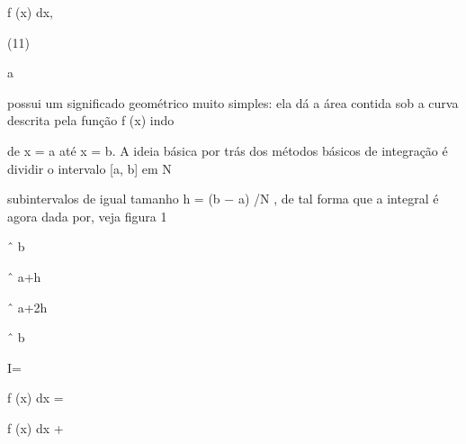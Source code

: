 \documentclass[a4paper,portrait,12pt]{article}
\begin{document}
\begin{flushleft}
f (x) dx,
\end{flushleft}





(11)





\begin{flushleft}
a
\end{flushleft}





\begin{flushleft}
possui um significado geom\'{e}trico muito simples: ela d\'{a} a \'{a}rea contida sob a curva descrita pela fun\c{c}\~{a}o f (x) indo
\end{flushleft}


\begin{flushleft}
de x = a at\'{e} x = b. A ideia b\'{a}sica por tr\'{a}s dos m\'{e}todos b\'{a}sicos de integra\c{c}\~{a}o \'{e} dividir o intervalo [a, b] em N
\end{flushleft}


\begin{flushleft}
subintervalos de igual tamanho h = (b $-$ a) /N , de tal forma que a integral \'{e} agora dada por, veja figura 1
\end{flushleft}


\begin{flushleft}
ˆ b
\end{flushleft}


\begin{flushleft}
ˆ a+h
\end{flushleft}


\begin{flushleft}
ˆ a+2h
\end{flushleft}


\begin{flushleft}
ˆ b
\end{flushleft}


\begin{flushleft}
I=
\end{flushleft}


\begin{flushleft}
f (x) dx =
\end{flushleft}


\begin{flushleft}
f (x) dx +
\end{flushleft}
\end{document}
